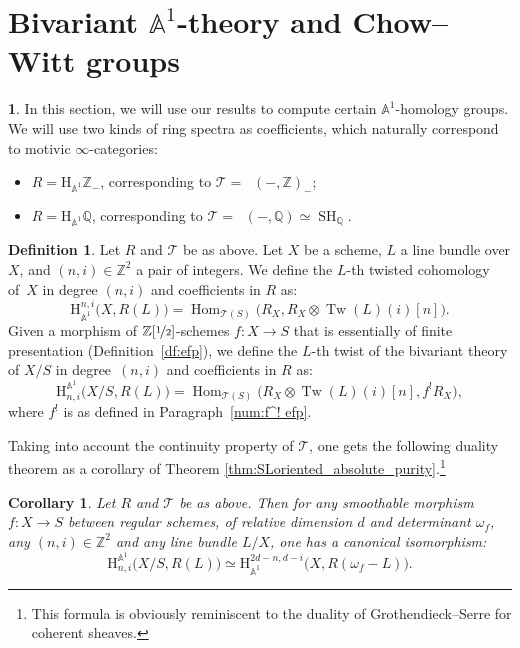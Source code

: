 \documentclass[JEP,XML,SOM,Unicode]{cedram}
\newcommand{\T}{\mathscr T}
\renewcommand{\AA}{\mathbb A}
\newcommand{\HA}{\mathrm H_{\AA^1}}
\newcommand{\BA}{\mathrm H^{\AA^1}}
\DeclareMathOperator{\SH}{SH}
\DeclareMathOperator{\DA}{D_{\AA^1}}
\DeclareMathOperator{\Hom}{Hom}
\DeclareMathOperator{\Tw}{Tw}
\newcommand{\ZZ} {\mathbb Z}
\newcommand{\ZZot} {\mathbb Z[\nicefrac 1 2]}
\newcommand{\QQ} {\mathbb Q}
\newtheorem{cor}[thm]{Corollary}
\theoremstyle{remark}
\theoremstyle{definition}
\newtheorem{df}[thm]{Definition}
\newtheorem{num}[thm]{}
\numberwithin{equation}{thm}
\begin{document}
\section{Bivariant \texorpdfstring{$\AA^1$}{A1}-theory and Chow--Witt groups}
\label{sec:bivariant}

\begin{num}
In this section, we will use our results to compute certain $\AA^1$-homology groups.
We will use two kinds of ring spectra as coefficients,
which naturally correspond to motivic $\infty$-categories:
\begin{itemize}
\item $R=\HA \ZZ_-$, corresponding to $\T=\DA(-,\ZZ)_-$;
\item $R=\HA \QQ$, corresponding to $\T=\DA(-,\QQ) \simeq \SH_\QQ$.
\end{itemize}
\end{num}
\begin{df}\label{df:bivariant_A1}
Let $R$ and $\T$ be as above.
Let $X$ be a scheme, $L$ a line bundle over $X$, and $(n,i) \in\ZZ^2$
a pair of integers.
We define the $L$-th twisted cohomology of~$X$ in degree $(n,i)$ and coefficients in $R$ as:
\[
\HA^{n,i}\big(X,R(L)\big)=\Hom_{\T(S)}\big(R_X,R_X\otimes \Tw(L)(i)[n]\big).
\]
Given a morphism
of $\ZZot$-schemes $f:X \to S$ that is essentially of finite presentation (Definition~\ref{df:efp}),
we define the $L$-th twist of the bivariant theory of $X/S$ in degree~$(n,i)$ and coefficients in $R$
as:
\[
\BA_{n,i}\big(X/S,R(L)\big)=\Hom_{\T(S)}\big(R_X\otimes \Tw(L)(i)[n],f^!R_X\big),
\]
where $f^!$ is as defined in Paragraph~\ref{num:f^! efp}.
\end{df}

Taking into account the continuity property of $\T$,
one gets the following duality theorem as a corollary of Theorem
\ref{thm:SLoriented_absolute_purity}.\footnote{This formula is obviously reminiscent
to the duality of Grothendieck--Serre for coherent sheaves.}
\begin{cor}\label{cor:BM=coh}
Let $R$ and $\T$ be as above.
Then for any smoothable morphism $f:X \to S$
between regular schemes,
of relative dimension $d$ and determinant $\omega_f$,
any $(n,i) \in \ZZ^2$ and any line bundle $L/X$, one has a canonical isomorphism:
\[
\BA_{n,i}\big(X/S,R(L)\big) \simeq \HA^{2d-n,d-i}\big(X,R(\omega_f-L)\big).
\]
\end{cor}
\end{document}
